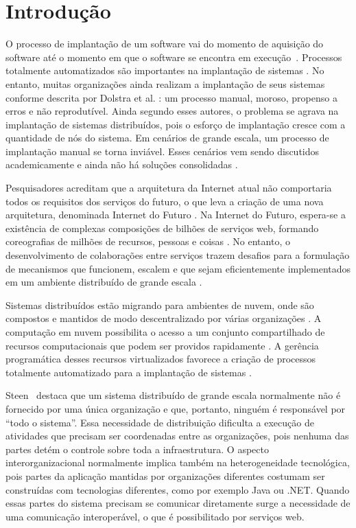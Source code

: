 \chapter{Introdução}
\label{cap:introducao}

O processo de implantação de um software vai do momento de aquisição do software até o momento em que o software se encontra em execução~\cite{DEPL2006}. Processos totalmente automatizados são importantes na implantação de sistemas \cite{Humble2011Continuous}. No entanto, muitas organizações ainda realizam a implantação de seus sistemas conforme descrita por Dolstra et al. \cite{Dolstra2005Configuration}: um processo manual, moroso, propenso a erros e não reprodutível. Ainda segundo esses autores, o problema se agrava na implantação de sistemas distribuídos, pois o esforço de implantação cresce com a quantidade de nós do sistema. Em cenários de grande escala, um processo de implantação manual se torna inviável. Esses cenários vem sendo discutidos academicamente e ainda não há soluções consolidadas \cite{Valerie2011FutureInternet}.

Pesquisadores acreditam que a arquitetura da Internet atual não comportaria todos os requisitos dos serviços do futuro, o que leva a criação de uma nova arquitetura, denominada Internet do Futuro \cite{Zahariadis2011FutureInternet}. Na Internet do Futuro, espera-se a existência de complexas composições de bilhões de serviços web, formando coreografias de milhões de recursos, pessoas e coisas \cite{Valerie2011FutureInternet}. No entanto, o desenvolvimento de colaborações entre serviços trazem desafios para a formulação de mecanismos que funcionem, escalem e que sejam eficientemente implementados em um ambiente distribuído de grande escala \cite{Steen2011VeryLarge}.

Sistemas distribuídos estão migrando para ambientes de nuvem, onde são compostos e mantidos de modo descentralizado por várias organizações \cite{Steen2011VeryLarge}. A computação em nuvem possibilita o acesso a um conjunto compartilhado de recursos computacionais que podem ser providos rapidamente \cite{Nist2011Cloud}. A gerência programática desses recursos virtualizados favorece a criação de processos totalmente automatizado para a implantação de sistemas \cite{Humble2011Continuous}.   

Steen~\cite{Steen2011VeryLarge} destaca que um sistema distribuído de grande escala normalmente não é fornecido por uma única organização e que, portanto, ninguém é responsável por ``todo o sistema''. Essa necessidade de distribuição dificulta a execução de atividades que precisam ser coordenadas entre as organizações, pois nenhuma das partes detém o controle sobre toda a infraestrutura. O aspecto interorganizacional normalmente implica também na heterogeneidade tecnológica, pois partes da aplicação mantidas por organizações diferentes costumam ser construídas com tecnologias diferentes, como por exemplo Java ou .NET. Quando essas partes do sistema precisam se comunicar diretamente surge a necessidade de uma comunicação interoperável, o que é possibilitado por serviços web. 

